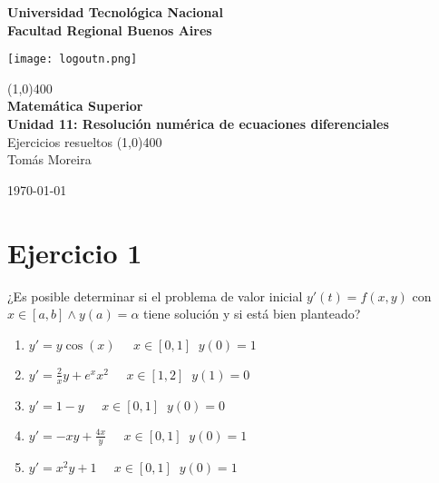 \documentclass[11pt]{article}
\begin{document}
		
	\begin{titlepage}
		\begin{center}
			\vspace*{0.5cm}
			\Large{\textbf{Universidad Tecnológica Nacional}}\\
			\Large{\textbf{Facultad Regional Buenos Aires}}\\
			\begin{center}
				\texttt{[image: logoutn.png]}
			\end{center}
			\vfill
			\line(1,0){400}\\
			\vspace*{0.3cm}
			\huge{\textbf{Matemática Superior}}\\
			\Large{\textbf{Unidad 11: Resolución numérica de ecuaciones diferenciales}}\\
			\large{Ejercicios resueltos}
			\line(1,0){400}\\
			\vfill
			Tomás Moreira \\
			
			
			\today
				
				
		\end{center}
	\end{titlepage}

	\tableofcontents
	\thispagestyle{empty}
	\clearpage

	\setcounter{page}{1}
	
	\section{Ejercicio 1}
	¿Es posible determinar si el problema de valor inicial $y'(t)=f(x,y)$ con $x \in [a,b] \wedge y(a)=\alpha$ tiene solución y si está bien planteado?
	
	\begin{enumerate}[label=\alph*)]
		\item $y'=y\cos(x) \;\;\;\;\; x\in[0,1] \;\; y(0)=1$
		\item $y'=\frac{2}{x}y+e^xx^2 \;\;\;\;\; x\in[1,2] \;\; y(1)=0$
		\item $y'=1-y \;\;\;\;\; x\in[0,1] \;\; y(0)=0$
		\item $y'=-xy+\frac{4x}{y} \;\;\;\;\; x\in[0,1] \;\; y(0)=1$
		\item $y'=x^2y+1 \;\;\;\;\; x\in[0,1] \;\; y(0)=1$
	\end{enumerate}
	
\end{document}

